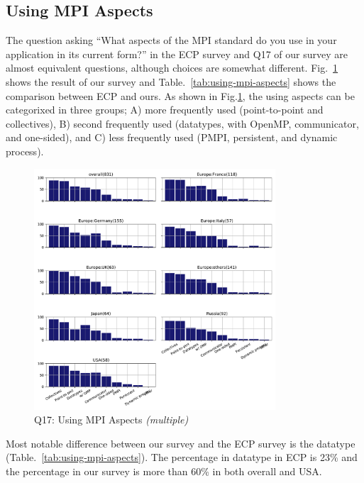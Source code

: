 \documentclass[conference,10pt,letterpaper]{IEEEtran}
\begin{document}
\subsection{Using MPI Aspects}

The question asking ``What aspects of the MPI standard do you use in
your application in its current form?'' in the ECP survey and Q17 of
our survey are almost equivalent
questions, although choices are somewhat
different. Fig.~\ref{fig:using-mpi-aspects} shows the result of our 
survey and Table.~\ref{tab:using-mpi-aspects} shows the comparison
between ECP and ours. As shown in Fig.\ref{fig:using-mpi-aspects}, the
using aspects can be categorixed in three groups; A) more frequently
used (point-to-point and collectives), B) second frequently used
(datatypes, with OpenMP, communicator, and one-sided), and C) less
frequently used (PMPI, persistent, and dynamic process).

\begin{figure}[htb]
\begin{center}
\includegraphics[width=9cm]{Figs/Q17.pdf}
\caption{Q17: Using MPI Aspects {\it(multiple)}}
\label{fig:using-mpi-aspects}
\end{center}
\end{figure}

Most notable difference between our survey and the ECP survey is the
datatype (Table.~\ref{tab:using-mpi-aspects}). The percentage in
datatype in ECP is 23\% and the percentage in our survey is more
than 60\% in both overall and USA. 
\end{document}
